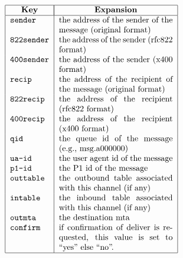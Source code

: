
\[\begin{tabular} {|l|p{0.4\textwidth}|}
\hline
	\multicolumn{1}{|c|}{\bf Key} & 
		\multicolumn{1}{|c|}{\bf Expansion} \\
\hline
	\tt sender & 
		the address of the sender of the message (original format) \\
	\tt 822sender & 
		the address of the sender (rfc822 format) \\
	\tt 400sender & 
		the address of the sender (x400 format) \\
	\tt recip & 
		the address of the recipient of the message (original format) \\ 
	\tt 822recip & 
		the address of the recipient (rfc822 format) \\
	\tt 400recip & 
		the address of the recipient (x400 format) \\
	\tt qid & 
		the queue id of the message (e.g., msg.a000000) \\
	\tt ua-id & 
		the user agent id of the message \\
	\tt p1-id & 
		the P1 id of the message \\
	\tt outtable & 
		the outbound table associated with this channel (if any)\\
	\tt intable & 
		the inbound table associated with this channel (if any)\\
	\tt outmta &
		the destination mta \\
	\tt confirm &
		if confirmation of deliver is requested, this value is
set to ``yes'' else ``no''. \\
\hline
\end{tabular}\]
